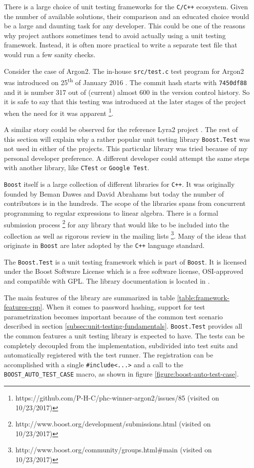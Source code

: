 There is a large choice of unit testing frameworks for the \texttt{C/C++} ecosystem. Given the number of available solutions, their comparison and an educated choice would be a large and daunting task for any developer. This could be one of the reasons why project authors sometimes tend to avoid actually using a unit testing framework. Instead, it is often more practical to write a separate test file that would run a few sanity checks.

Consider the case of Argon2. The in-house \texttt{src/test.c} test program for Argon2 was introduced on 25\textsuperscript{th} of January 2016 \cite{github:2017:argon2}. The commit hash starts with \texttt{7450df88} and it is number 317 out of (current) almost 600 in the version control history. So it is safe to say that this testing was introduced at the later stages of the project when the need for it was apparent \footnote{https://github.com/P-H-C/phc-winner-argon2/issues/85 (visited on 10/23/2017)}.

A similar story could be observed for the reference Lyra2 project \cite{github:2017:lyra}. The rest of this section will explain why a rather popular unit testing library \texttt{Boost.Test} was not used in either of the projects. This particular library was tried because of my personal developer preference. A different developer could attempt the same steps with another library, like \texttt{CTest} or \texttt{Google Test}.

\texttt{Boost} itself is a large collection of different libraries for \texttt{C++}. It was originally founded by Beman Dawes and David Abrahams but today the number of contributors is in the hundreds. The scope of the libraries spans from concurrent programming to regular expressions to linear algebra. There is a formal submission process \footnote{http://www.boost.org/development/submissions.html (visited on 10/23/2017)} for any library that would like to be included into the collection as well as rigorous review in the mailing lists \footnote{http://www.boost.org/community/groups.html\#main (visited on 10/23/2017)}. Many of the ideas that originate in \texttt{Boost} are later adopted by the \texttt{C++} language standard.

The \texttt{Boost.Test} is a unit testing framework which is part of \texttt{Boost}. It is licensed under the Boost Software License which is a free software license, OSI-approved and compatible with GPL. The library documentation is located in \cite{boost:2017:test-docs}.

The main features of the library are summarized in table \ref{table:framework-features-cpp}. When it comes to password hashing, support for test parametrization becomes important because of the common test scenario described in section \ref{subsec:unit-testing-fundamentals}. \texttt{Boost.Test} provides all the common features a unit testing library is expected to have. The tests can be completely decoupled from the implementation, subdivided  into test suits and automatically registered with the test runner. The registration can be accomplished with a single \texttt{#include<...>} and a call to the \texttt{BOOST_AUTO_TEST_CASE} macro, as shown in figure \ref{figure:boost-auto-test-case}.

